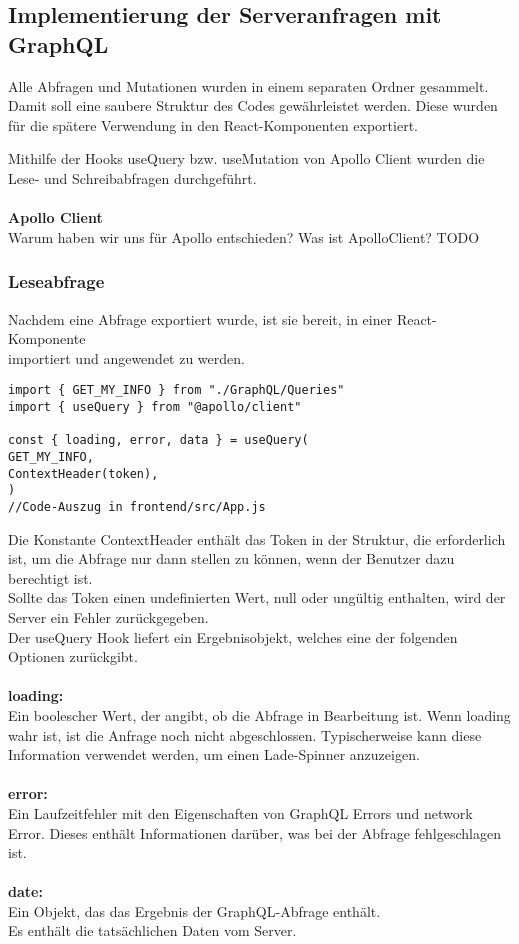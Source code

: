 \subsection{Implementierung der Serveranfragen mit GraphQL}
Alle Abfragen und Mutationen wurden in einem separaten Ordner gesammelt.
Damit soll eine saubere Struktur des Codes gewährleistet werden.
Diese wurden für die spätere Verwendung in den React-Komponenten exportiert.

Mithilfe der Hooks useQuery bzw. useMutation von Apollo Client wurden die Lese- und Schreibabfragen durchgeführt.
\\\\
\textbf{Apollo Client}\\
Warum haben wir uns für Apollo entschieden? Was ist ApolloClient?
TODO
\newpage

\subsubsection{Leseabfrage}
Nachdem eine Abfrage exportiert wurde, ist sie bereit, in einer React-Komponente \\
importiert und angewendet zu werden.

\begin{lstlisting}
import { GET_MY_INFO } from "./GraphQL/Queries"
import { useQuery } from "@apollo/client"

const { loading, error, data } = useQuery(
GET_MY_INFO,
ContextHeader(token),
)
//Code-Auszug in frontend/src/App.js

\end{lstlisting}
Die Konstante ContextHeader enthält das Token in der Struktur, die erforderlich ist, um die Abfrage nur dann stellen zu können, wenn der Benutzer dazu berechtigt ist.
\\
Sollte das Token einen undefinierten Wert, null oder ungültig enthalten, wird der Server ein Fehler zurückgegeben.
\\
Der useQuery Hook liefert ein Ergebnisobjekt, welches eine der folgenden Optionen zurückgibt.
\\\\
\textbf{loading:}\\
Ein boolescher Wert, der angibt, ob die Abfrage in Bearbeitung ist.
Wenn loading wahr ist, ist die Anfrage noch nicht abgeschlossen. Typischerweise kann diese Information verwendet werden, um einen Lade-Spinner anzuzeigen.
\\\\
\textbf{error:}\\
Ein Laufzeitfehler mit den Eigenschaften von GraphQL Errors und network Error.
Dieses enthält Informationen darüber, was bei der Abfrage fehlgeschlagen  ist.
\\\\
\textbf{date:}\\
Ein Objekt, das das Ergebnis der GraphQL-Abfrage enthält.
\\Es enthält die tatsächlichen Daten vom Server.
\\
\newpage

